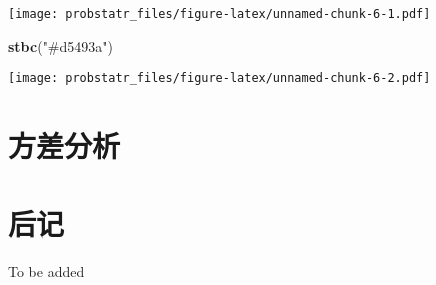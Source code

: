 \documentclass[]{ctexbook}
\newenvironment{Shaded}{\begin{snugshade}}{\end{snugshade}}
\newcommand{\KeywordTok}[1]{\textcolor[rgb]{0.13,0.29,0.53}{\textbf{#1}}}
\newcommand{\NormalTok}[1]{#1}
\newcommand{\StringTok}[1]{\textcolor[rgb]{0.31,0.60,0.02}{#1}}
\begin{document}
\texttt{[image: probstatr\_files/figure-latex/unnamed-chunk-6-1.pdf]}

\begin{Shaded}
\begin{Highlighting}[]
\KeywordTok{stbc}\NormalTok{(}\StringTok{"#d5493a"}\NormalTok{)}
\end{Highlighting}
\end{Shaded}

\texttt{[image: probstatr\_files/figure-latex/unnamed-chunk-6-2.pdf]}

\mainmatter

\hypertarget{ANOVA}{%
\chapter{方差分析}\label{ANOVA}}

\cleardoublepage

\hypertarget{appendix-}{%
\appendix {}}


\hypertarget{sound}{%
\chapter{后记}\label{sound}}

To be added



\backmatter
\printindex
\end{document}
